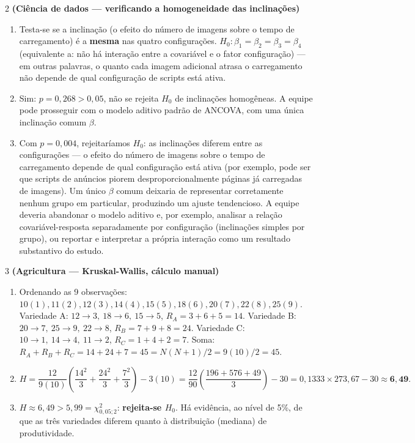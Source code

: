 \documentclass[11pt]{article}
\begin{document}
\begin{questao}{2} \textbf{(Ciência de dados --- verificando a homogeneidade das inclinações)}
\end{questao}
\begin{solucao}
\begin{enumerate}[label=(\alph*)]
  \item Testa-se se a inclinação (o efeito do número de imagens sobre o tempo de carregamento) é
    a \textbf{mesma} nas quatro configurações. $H_0: \beta_1=\beta_2=\beta_3=\beta_4$ (equivalente
    a: não há interação entre a covariável e o fator configuração) --- em outras palavras, o
    quanto cada imagem adicional atrasa o carregamento não depende de qual configuração de
    scripts está ativa.
  \item Sim: $p=0{,}268 > 0{,}05$, não se rejeita $H_0$ de inclinações homogêneas. A equipe pode
    prosseguir com o modelo aditivo padrão de ANCOVA, com uma única inclinação comum $\beta$.
  \item Com $p=0{,}004$, rejeitaríamos $H_0$: as inclinações diferem entre as configurações --- o
    efeito do número de imagens sobre o tempo de carregamento depende de qual configuração está
    ativa (por exemplo, pode ser que scripts de anúncios piorem desproporcionalmente páginas já
    carregadas de imagens). Um único $\beta$ comum deixaria de representar corretamente nenhum
    grupo em particular, produzindo um ajuste tendencioso. A equipe deveria abandonar o modelo
    aditivo e, por exemplo, analisar a relação covariável-resposta separadamente por
    configuração (inclinações simples por grupo), ou reportar e interpretar a própria interação
    como um resultado substantivo do estudo.
\end{enumerate}
\end{solucao}

\begin{questao}{3} \textbf{(Agricultura --- Kruskal-Wallis, cálculo manual)}
\end{questao}
\begin{solucao}
\begin{enumerate}[label=(\alph*)]
  \item Ordenando as 9 observações: $10(1), 11(2), 12(3), 14(4), 15(5), 18(6), 20(7), 22(8),
    25(9)$. Variedade A: $12\to3,\ 18\to6,\ 15\to5$, $R_A=3+6+5=14$. Variedade B:
    $20\to7,\ 25\to9,\ 22\to8$, $R_B=7+9+8=24$. Variedade C: $10\to1,\ 14\to4,\ 11\to2$,
    $R_C=1+4+2=7$. Soma: $R_A+R_B+R_C=14+24+7=45=N(N+1)/2=9(10)/2=45$. \checkmark
  \item
    \[
    H = \frac{12}{9(10)}\left(\frac{14^2}{3}+\frac{24^2}{3}+\frac{7^2}{3}\right) - 3(10)
    = \frac{12}{90}\left(\frac{196+576+49}{3}\right) - 30
    = 0{,}1333 \times 273{,}67 - 30 \approx \mathbf{6{,}49}.
    \]
  \item $H \approx 6{,}49 > 5{,}99 = \chi^2_{0{,}05;2}$: \textbf{rejeita-se $H_0$}. Há evidência,
    ao nível de 5\%, de que as três variedades diferem quanto à distribuição (mediana) de
    produtividade.
\end{enumerate}
\end{solucao}
\end{document}
